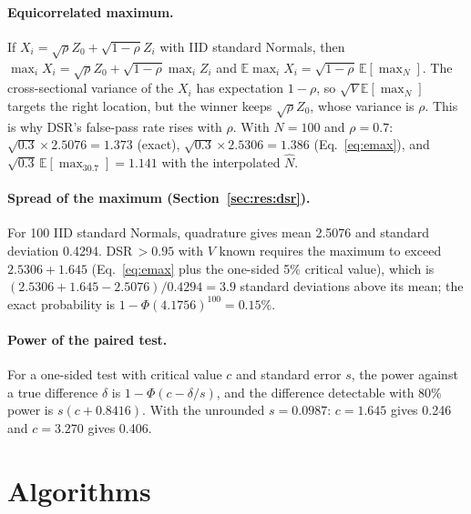 \documentclass[11pt,a4paper]{article}
\newcommand{\E}{\mathbb{E}}
\begin{document}
\paragraph{Equicorrelated maximum.} If $X_i=\sqrt\rho Z_0+\sqrt{1-\rho}Z_i$ with IID standard Normals, then $\max_iX_i=\sqrt\rho Z_0+\sqrt{1-\rho}\max_iZ_i$ and $\E\max_iX_i=\sqrt{1-\rho}\,\E[\max_N]$. The cross-sectional variance of the $X_i$ has expectation $1-\rho$, so $\sqrt{V}\E[\max_N]$ targets the right location, but the winner keeps $\sqrt\rho Z_0$, whose variance is $\rho$. This is why DSR's false-pass rate rises with $\rho$. With $N=100$ and $\rho=0.7$: $\sqrt{0.3}\times2.5076=1.373$ (exact), $\sqrt{0.3}\times2.5306=1.386$ (Eq.~\ref{eq:emax}), and $\sqrt{0.3}\,\E[\max_{30.7}]=1.141$ with the interpolated $\hat N$.

\paragraph{Spread of the maximum (Section~\ref{sec:res:dsr}).} For 100 IID standard Normals, quadrature gives mean 2.5076 and standard deviation 0.4294. DSR$\,>0.95$ with $V$ known requires the maximum to exceed $2.5306+1.645$ (Eq.~\eqref{eq:emax} plus the one-sided 5\% critical value), which is $(2.5306+1.645-2.5076)/0.4294=3.9$ standard deviations above its mean; the exact probability is $1-\Phi(4.1756)^{100}=0.15\%$.

\paragraph{Power of the paired test.} For a one-sided test with critical value $c$ and standard error $s$, the power against a true difference $\delta$ is $1-\Phi(c-\delta/s)$, and the difference detectable with 80\% power is $s(c+0.8416)$. With the unrounded $s=0.0987$: $c=1.645$ gives 0.246 and $c=3.270$ gives 0.406.

\section{Algorithms}\label{app:algorithms}
\end{document}
